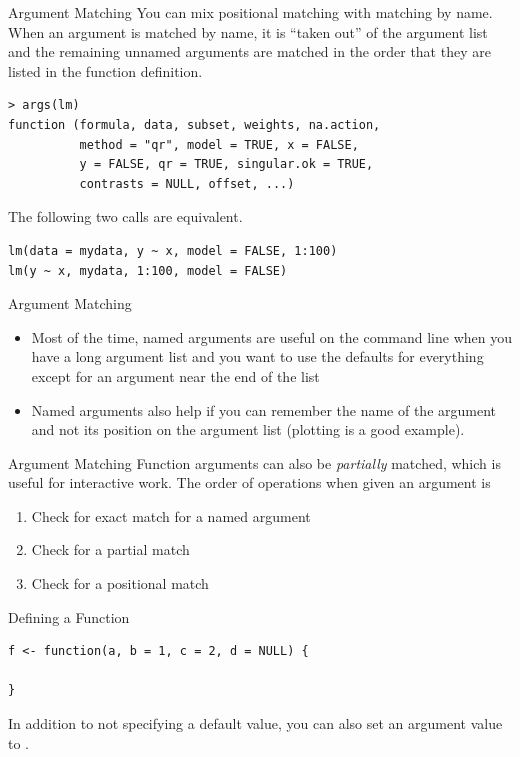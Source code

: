 \documentclass[aspectratio=169]{beamer}
\begin{document}
\begin{frame}[fragile]{Argument Matching}
You can mix positional matching with matching by name.  When an
argument is matched by name, it is ``taken out'' of the argument list
and the remaining unnamed arguments are matched in the order that they
are listed in the function definition.
\begin{verbatim}
> args(lm)
function (formula, data, subset, weights, na.action, 
          method = "qr", model = TRUE, x = FALSE, 
          y = FALSE, qr = TRUE, singular.ok = TRUE, 
          contrasts = NULL, offset, ...) 
\end{verbatim}
The following two calls are equivalent.
\begin{verbatim}
lm(data = mydata, y ~ x, model = FALSE, 1:100)
lm(y ~ x, mydata, 1:100, model = FALSE)
\end{verbatim}
\end{frame}

\begin{frame}{Argument Matching}
\begin{itemize}
\item
Most of the time, named arguments are useful on the command line when
you have a long argument list and you want to use the defaults for
everything except for an argument near the end of the list
\item
Named arguments also help if you can remember the name of the argument
and not its position on the argument list (plotting is a good
example).
\end{itemize}
\end{frame}

\begin{frame}{Argument Matching}
Function arguments can also be \textit{partially} matched, which is
useful for interactive work.  The order of operations when given an
argument is
\begin{enumerate}
\item
Check for exact match for a named argument
\item
Check for a partial match
\item
Check for a positional match
\end{enumerate}
\end{frame}

\begin{frame}[fragile]{Defining a Function}
\begin{verbatim}
f <- function(a, b = 1, c = 2, d = NULL) {
        
}
\end{verbatim}
In addition to not specifying a default value, you can also set an
argument value to .
\end{frame}
\end{document}
